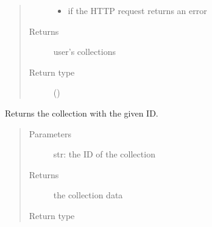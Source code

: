 \documentclass[letterpaper,10pt,english]{sphinxmanual}
\begin{document}
\begin{fulllineitems}
\begin{fulllineitems}
\begin{quote}
\begin{description}
\begin{itemize}
\item {} 
\sphinxAtStartPar
{\hyperref[\detokenize{autoapi/pine/client/exceptions/index:pine.client.exceptions.PineClientHttpException}]{}} \textendash{} if the HTTP request returns an error

\end{itemize}

\item[{Returns}] \leavevmode
\sphinxAtStartPar
user’s collections

\item[{Return type}] \leavevmode
\sphinxAtStartPar
{}()

\end{description}\end{quote}

\end{fulllineitems}


\begin{fulllineitems}
\label{\detokenize{autoapi/pine/client/index:pine.client.PineClient.get_collection}}
\sphinxAtStartPar
Returns the collection with the given ID.
\begin{quote}\begin{description}
\item[{Parameters}] \leavevmode
\sphinxAtStartPar
{} \textendash{} str: the ID of the collection

\item[{Returns}] \leavevmode
\sphinxAtStartPar
the collection data

\item[{Return type}] \leavevmode
\sphinxAtStartPar
{}

\end{description}\end{quote}


\end{fulllineitems}
\end{fulllineitems}
\end{document}
